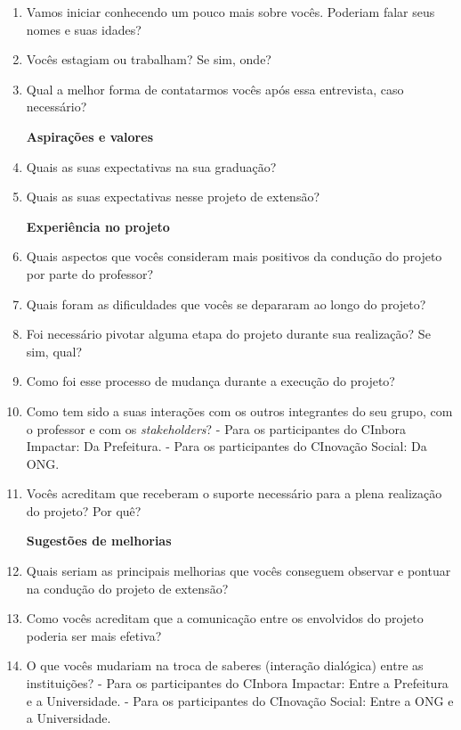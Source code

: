 \begin{enumerate}
    \item Vamos iniciar conhecendo um pouco mais sobre vocês. Poderiam falar seus nomes e suas idades?  
    \item Vocês estagiam ou trabalham? Se sim, onde?  
    \item Qual a melhor forma de contatarmos vocês após essa entrevista, caso necessário?  
\par\vspace{1\baselineskip}
\textbf{Aspirações e valores}
    \item Quais as suas expectativas na sua graduação?  
    \item Quais as suas expectativas nesse projeto de extensão?  
\par\vspace{1\baselineskip}
\textbf{Experiência no projeto}
    \item Quais aspectos que vocês consideram mais positivos da condução do projeto por parte do professor?  
    \item Quais foram as dificuldades que vocês se depararam ao longo do projeto?  
    \item Foi necessário pivotar alguma etapa do projeto durante sua realização? Se sim, qual?  
    \item Como foi esse processo de mudança durante a execução do projeto?  
    \item Como tem sido a suas interações com os outros integrantes do seu grupo, com o professor e com os \textit{stakeholders}?
     - Para os participantes do CInbora Impactar: Da Prefeitura.
    - Para os participantes do CInovação Social: Da \gls{ONG}.
    \item Vocês acreditam que receberam o suporte necessário para a plena realização do projeto? Por quê?
\par\vspace{1\baselineskip}
\textbf{Sugestões de melhorias}
    \item Quais seriam as principais melhorias que vocês conseguem observar e pontuar na condução do projeto de extensão?  
    \item Como vocês acreditam que a comunicação entre os envolvidos do projeto poderia ser mais efetiva?  
    \item O que vocês mudariam na troca de saberes (interação dialógica) entre as instituições?  
    - Para os participantes do CInbora Impactar: Entre a Prefeitura e a Universidade.
    - Para os participantes do CInovação Social: Entre a \gls{ONG} e a Universidade.

\end{enumerate}
